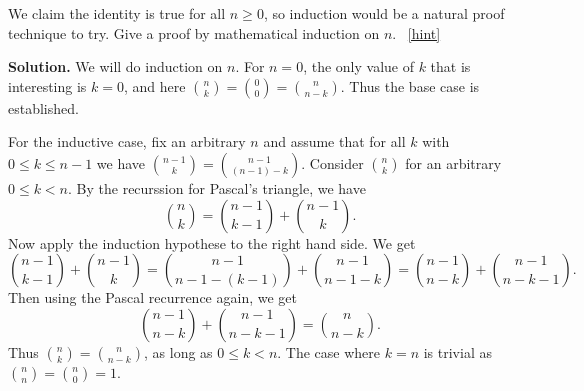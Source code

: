 \documentclass{book}
\begin{document}
\setcounter{project}{73}
\addtocounter{project}{-1}
\begin{activity}[]\label{activity-66}
\hypertarget{p-584}{}%
We claim the identity is true for all \(n \ge 0\), so induction would be a natural proof technique to try.  Give a proof by mathematical induction on \(n\).%
~\hfill{\tiny\hyperlink{a-73}{[hint]}\hypertarget{q-73}{}}\par\smallskip%
\noindent\textbf{Solution.}\hypertarget{solution-55}{}\quad%
\hypertarget{p-586}{}%
We will do induction on \(n\).  For \(n = 0\), the only value of \(k\) that is interesting is \(k=0\), and here \(\binom{n}{k} = \binom{0}{0} = \binom{n}{n-k}\).  Thus the base case is established.%
\par
\hypertarget{p-587}{}%
For the inductive case, fix an arbitrary \(n\) and assume that for all \(k\) with \(0 \le k \le n-1\) we have \(\binom{n-1}{k} = \binom{n-1}{(n-1)-k}\).  Consider \(\binom{n}{k}\) for an arbitrary \(0 \le k \lt n\).  By the recurssion for Pascal's triangle, we have%
\begin{equation*}
\binom{n}{k} = \binom{n-1}{k-1} + \binom{n-1}{k}.
\end{equation*}
Now apply the induction hypothese to the right hand side.  We get%
\begin{equation*}
\binom{n-1}{k-1} + \binom{n-1}{k} = \binom{n-1}{n-1-(k-1)} + \binom{n-1}{n-1 -k} = \binom{n-1}{n-k} + \binom{n-1}{n-k-1}.
\end{equation*}
Then using the Pascal recurrence again, we get%
\begin{equation*}
\binom{n-1}{n-k} + \binom{n-1}{n-k-1} = \binom{n}{n-k}.
\end{equation*}
Thus \(\binom{n}{k} = \binom{n}{n-k}\), as long as \(0 \le k \lt n\).  The case where \(k = n\) is trivial as \(\binom{n}{n} = \binom{n}{0} = 1\).%
\end{activity}
\end{document}
